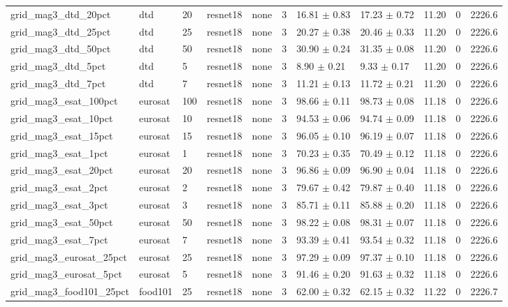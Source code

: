\begin{tabular}{lllllllllll}
grid_mag3_dtd_20pct & dtd & 20 & resnet18 & none & 3 & 16.81 $\pm$ 0.83 & 17.23 $\pm$ 0.72 & 11.20 & 0 & 2226.6 \\
grid_mag3_dtd_25pct & dtd & 25 & resnet18 & none & 3 & 20.27 $\pm$ 0.38 & 20.46 $\pm$ 0.33 & 11.20 & 0 & 2226.6 \\
grid_mag3_dtd_50pct & dtd & 50 & resnet18 & none & 3 & 30.90 $\pm$ 0.24 & 31.35 $\pm$ 0.08 & 11.20 & 0 & 2226.6 \\
grid_mag3_dtd_5pct & dtd & 5 & resnet18 & none & 3 & 8.90 $\pm$ 0.21 & 9.33 $\pm$ 0.17 & 11.20 & 0 & 2226.6 \\
grid_mag3_dtd_7pct & dtd & 7 & resnet18 & none & 3 & 11.21 $\pm$ 0.13 & 11.72 $\pm$ 0.21 & 11.20 & 0 & 2226.6 \\
grid_mag3_esat_100pct & eurosat & 100 & resnet18 & none & 3 & 98.66 $\pm$ 0.11 & 98.73 $\pm$ 0.08 & 11.18 & 0 & 2226.6 \\
grid_mag3_esat_10pct & eurosat & 10 & resnet18 & none & 3 & 94.53 $\pm$ 0.06 & 94.74 $\pm$ 0.09 & 11.18 & 0 & 2226.6 \\
grid_mag3_esat_15pct & eurosat & 15 & resnet18 & none & 3 & 96.05 $\pm$ 0.10 & 96.19 $\pm$ 0.07 & 11.18 & 0 & 2226.6 \\
grid_mag3_esat_1pct & eurosat & 1 & resnet18 & none & 3 & 70.23 $\pm$ 0.35 & 70.49 $\pm$ 0.12 & 11.18 & 0 & 2226.6 \\
grid_mag3_esat_20pct & eurosat & 20 & resnet18 & none & 3 & 96.86 $\pm$ 0.09 & 96.90 $\pm$ 0.04 & 11.18 & 0 & 2226.6 \\
grid_mag3_esat_2pct & eurosat & 2 & resnet18 & none & 3 & 79.67 $\pm$ 0.42 & 79.87 $\pm$ 0.40 & 11.18 & 0 & 2226.6 \\
grid_mag3_esat_3pct & eurosat & 3 & resnet18 & none & 3 & 85.71 $\pm$ 0.11 & 85.88 $\pm$ 0.20 & 11.18 & 0 & 2226.6 \\
grid_mag3_esat_50pct & eurosat & 50 & resnet18 & none & 3 & 98.22 $\pm$ 0.08 & 98.31 $\pm$ 0.07 & 11.18 & 0 & 2226.6 \\
grid_mag3_esat_7pct & eurosat & 7 & resnet18 & none & 3 & 93.39 $\pm$ 0.41 & 93.54 $\pm$ 0.32 & 11.18 & 0 & 2226.6 \\
grid_mag3_eurosat_25pct & eurosat & 25 & resnet18 & none & 3 & 97.29 $\pm$ 0.09 & 97.37 $\pm$ 0.10 & 11.18 & 0 & 2226.6 \\
grid_mag3_eurosat_5pct & eurosat & 5 & resnet18 & none & 3 & 91.46 $\pm$ 0.20 & 91.63 $\pm$ 0.32 & 11.18 & 0 & 2226.6 \\
grid_mag3_food101_25pct & food101 & 25 & resnet18 & none & 3 & 62.00 $\pm$ 0.32 & 62.15 $\pm$ 0.32 & 11.22 & 0 & 2226.7 \\

\end{tabular}
